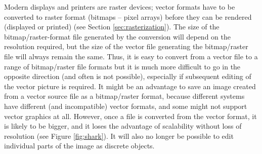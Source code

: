\documentclass[]{usiinfbachelorproject}
\begin{document}
Modern displays and printers are raster devices; vector formats have to be converted to raster format (bitmaps -- pixel arrays) before they can be rendered (displayed or printed) (see Section \ref{sec:rasterization}). The size of the bitmap/raster-format file generated by the conversion will depend on the resolution required, but the size of the vector file generating the bitmap/raster file will always remain the same. Thus, it is easy to convert from a vector file to a range of bitmap/raster file formats but it is much more difficult to go in the opposite direction (and often is not possible), especially if subsequent editing of the vector picture is required. It might be an advantage to save an image created from a vector source file as a bitmap/raster format, because different systems have different (and incompatible) vector formats, and some might not support vector graphics at all. However, once a file is converted from the vector format, it is likely to be bigger, and it loses the advantage of scalability without loss of resolution (see Figure \ref{fig:shark}). It will also no longer be possible to edit individual parts of the image as discrete objects.
\end{document}
